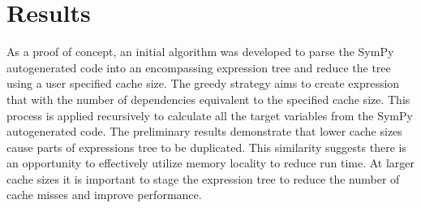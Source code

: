 \documentclass[10pt, conference]{IEEEtran} %
\begin{document}


\vspace{-0.15in}
\section{Results}
As a proof of concept, an initial algorithm was developed to parse the SymPy autogenerated code into an encompassing expression tree and reduce the tree using a user specified cache size. The greedy strategy aims to create expression that with the number of dependencies equivalent to the specified cache size. This process is applied recursively to calculate all the target variables from the SymPy autogenerated code.
The preliminary results demonstrate that lower cache sizes cause parts of expressions tree to be duplicated. This similarity suggests there is an opportunity to effectively utilize memory locality to reduce run time. At larger cache sizes it is important to stage the expression tree to reduce the number of cache misses and improve performance.  
\end{document}
